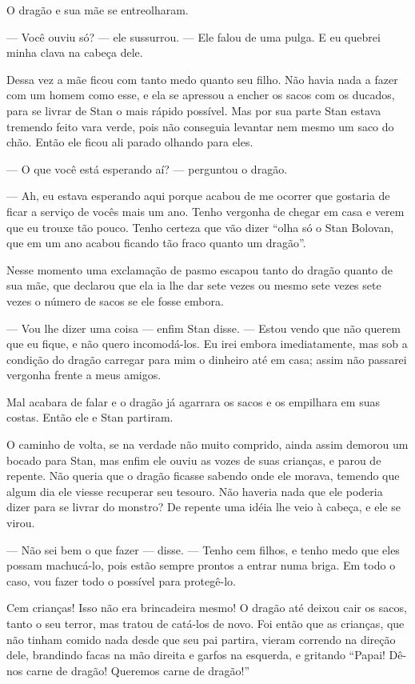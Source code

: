 O dragão e sua mãe se entreolharam.

— Você ouviu só? — ele sussurrou. — Ele falou de uma pulga. E eu
quebrei minha clava na cabeça dele.

Dessa vez a mãe ficou com tanto medo quanto seu filho. Não havia nada
a fazer com um homem como esse, e ela se apressou a encher os sacos
com os ducados, para se livrar de Stan o mais rápido possível. Mas
por sua parte Stan estava tremendo feito vara verde, pois não
conseguia levantar nem mesmo um saco do chão. Então ele ficou ali
parado olhando para eles.

— O que você está esperando aí? — perguntou o dragão.

— Ah, eu estava esperando aqui porque acabou de me ocorrer que
gostaria de ficar a serviço de vocês mais um ano. Tenho vergonha de
chegar em casa e verem que eu trouxe tão pouco. Tenho certeza que vão
dizer “olha só o Stan Bolovan, que em um ano acabou ficando tão fraco
quanto um dragão”.

Nesse momento uma exclamação de pasmo escapou tanto do dragão quanto
de sua mãe, que declarou que ela ia lhe dar sete vezes ou mesmo sete
vezes sete vezes o número de sacos se ele fosse embora.

— Vou lhe dizer uma coisa — enfim Stan disse. — Estou vendo que não
querem que eu fique, e não quero incomodá-los. Eu irei embora
imediatamente, mas sob a condição do dragão carregar para mim o
dinheiro até em casa; assim não passarei vergonha frente a meus
amigos.

Mal acabara de falar e o dragão já agarrara os sacos e os empilhara em
suas costas. Então ele e Stan partiram.

O caminho de volta, se na verdade não muito comprido, ainda assim
demorou um bocado para Stan, mas enfim ele ouviu as vozes de suas
crianças, e parou de repente. Não queria que o dragão ficasse sabendo
onde ele morava, temendo que algum dia ele viesse recuperar seu
tesouro. Não haveria nada que ele poderia dizer para se livrar do
monstro? De repente uma idéia lhe veio à cabeça, e ele se virou.

— Não sei bem o que fazer — disse. — Tenho cem filhos, e tenho medo
que eles possam machucá-lo, pois estão sempre prontos a entrar numa
briga. Em todo o caso, vou fazer todo o possível para protegê-lo.

Cem crianças! Isso não era brincadeira mesmo! O dragão até deixou cair
os sacos, tanto o seu terror, mas tratou de catá-los de novo. Foi
então que as crianças, que não tinham comido nada desde que seu pai
partira, vieram correndo na direção dele, brandindo facas na mão
direita e garfos na esquerda, e gritando “Papai! Dê-nos carne de
dragão! Queremos carne de dragão!”

